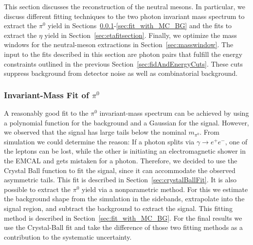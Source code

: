 This section discusses the reconstruction of the neutral mesons. In particular, we discuss different fitting techniques to the two photon invariant mass spectrum to extract the $\pi^0$ yield in Sections~\ref{sec:pi0fitsection}-\ref{sec:fit_with_MC_BG} and the fits to extract the $\eta$ yield in Section~\ref{sec:etafitsection}. Finally, we optimize the mass windows for the neutral-meson extractions in Section~\ref{sec:masswindow}. The input to the fits described in this section are photon pairs that fulfill the energy constraints outlined in the previous Section~\ref{sec:fidAndEnergyCuts}. 
These cuts suppress background from detector noise as well as combinatorial background.

\subsubsection{\texorpdfstring{Invariant-Mass Fit of $\pi^0$}{pi0 fit}}
\label{sec:pi0fitsection}
A reasonably good fit to the $\pi^0$ invariant-mass spectrum can be achieved by using a polynomial function for the background and a Gaussian for the signal. However, we observed that the signal has large tails below the nominal $m_{\pi^0}$. From simulation we could determine the reason: If a photon splits via  $\gamma\rightarrow e^+e^-$, one of the leptons can be lost, while the other is initiating an electromagnetic shower in the EMCAL and gets mistaken for a photon.
 Therefore, we decided to use the Crystal Ball function to fit the signal, since it can accommodate the observed asymmetric tails.  This fit is described in Section~\ref{sec:crystalBallFit}.
 It is also possible to extract the $\pi^0$ yield via a nonparametric method. For this we estimate the background shape from the simulation in the sidebands, extrapolate into the signal region, and subtract the background to extract the signal.  This fitting method is described in Section~\ref{sec:fit_with_MC_BG}.
For the final results we use the Crystal-Ball fit and take the difference of those two fitting methods as a contribution to the systematic uncertainty.

